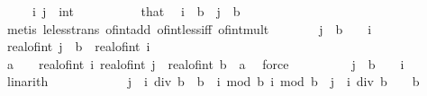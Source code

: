\begin{isabellebody}
\ \ \ \ \ i\ j\ {\isacharcolon}{\kern0pt}{\isacharcolon}{\kern0pt}\ int\isanewline
\ \ \isamarkupfalse%
\ {\isacharminus}{\kern0pt}\isanewline
\ \ \ \ \isamarkupfalse%
\ that\ \isamarkupfalse%
\ {\isachardoublequoteopen}i\ {\isacharless}{\kern0pt}\ b\ {\isacharplus}{\kern0pt}\ j\ {\isacharasterisk}{\kern0pt}\ b{\isachardoublequoteclose}\isanewline
\ \ \ \ \ \ \isamarkupfalse%
\ {\isacharparenleft}{\kern0pt}metis\ le{\isacharunderscore}{\kern0pt}less{\isacharunderscore}{\kern0pt}trans\ of{\isacharunderscore}{\kern0pt}int{\isacharunderscore}{\kern0pt}add\ of{\isacharunderscore}{\kern0pt}int{\isacharunderscore}{\kern0pt}less{\isacharunderscore}{\kern0pt}iff\ of{\isacharunderscore}{\kern0pt}int{\isacharunderscore}{\kern0pt}mult{\isacharparenright}{\kern0pt}\isanewline
\ \ \ \ \isamarkupfalse%
\ \isamarkupfalse%
\ {\isachardoublequoteopen}j\ {\isacharasterisk}{\kern0pt}\ b\ {\isacharless}{\kern0pt}\ {}\ {\isacharplus}{\kern0pt}\ i{\isachardoublequoteclose}\isanewline
\ \ \ \ \isamarkupfalse%
\ {\isacharminus}{\kern0pt}\isanewline
\ \ \ \ \ \ \isamarkupfalse%
\ {\isachardoublequoteopen}real{\isacharunderscore}{\kern0pt}of{\isacharunderscore}{\kern0pt}int\ {\isacharparenleft}{\kern0pt}j\ {\isacharasterisk}{\kern0pt}\ b{\isacharparenright}{\kern0pt}\ {\isacharless}{\kern0pt}\ real{\isacharunderscore}{\kern0pt}of{\isacharunderscore}{\kern0pt}int\ i\ {\isacharplus}{\kern0pt}\ {}{\isachardoublequoteclose}\isanewline
\ \ \ \ \ \ \ \ \isamarkupfalse%
\ {\isacartoucheopen}a\ {\isacharless}{\kern0pt}\ {}\ {\isacharplus}{\kern0pt}\ real{\isacharunderscore}{\kern0pt}of{\isacharunderscore}{\kern0pt}int\ i{\isacartoucheclose}\ {\isacartoucheopen}real{\isacharunderscore}{\kern0pt}of{\isacharunderscore}{\kern0pt}int\ j\ {\isacharasterisk}{\kern0pt}\ real{\isacharunderscore}{\kern0pt}of{\isacharunderscore}{\kern0pt}int\ b\ {\isasymle}\ a{\isacartoucheclose}\ \isamarkupfalse%
\ force\isanewline
\ \ \ \ \ \ \isamarkupfalse%
\ \isamarkupfalse%
\ {\isachardoublequoteopen}j\ {\isacharasterisk}{\kern0pt}\ b\ {\isacharless}{\kern0pt}\ {}\ {\isacharplus}{\kern0pt}\ i{\isachardoublequoteclose}\ \isamarkupfalse%
\ linarith\isanewline
\ \ \ \ \isamarkupfalse%
\isanewline
\ \ \ \ \isamarkupfalse%
\ \isamarkupfalse%
\ {\isachardoublequoteopen}{\isacharparenleft}{\kern0pt}j\ {\isacharminus}{\kern0pt}\ i\ div\ b{\isacharparenright}{\kern0pt}\ {\isacharasterisk}{\kern0pt}\ b\ {\isasymle}\ i\ mod\ b{\isachardoublequoteclose}\ {\isachardoublequoteopen}i\ mod\ b\ {\isacharless}{\kern0pt}\ {\isacharparenleft}{\kern0pt}{\isacharparenleft}{\kern0pt}j\ {\isacharminus}{\kern0pt}\ i\ div\ b{\isacharparenright}{\kern0pt}\ {\isacharplus}{\kern0pt}\ {}{\isacharparenright}{\kern0pt}\ {\isacharasterisk}{\kern0pt}\ b{\isachardoublequoteclose}\isanewline

\end{isabellebody}
